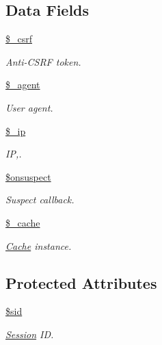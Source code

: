 \subsection*{Data Fields}
\begin{DoxyCompactItemize}
\item 
\hypertarget{class_session_a871411a78a77c508569c380dd06fdd51}{}\label{class_session_a871411a78a77c508569c380dd06fdd51} 
\hyperlink{class_session_a871411a78a77c508569c380dd06fdd51}{\$\+\_\+csrf}
\begin{DoxyCompactList}\small\item\em Anti-\/\+C\+S\+RF token. \end{DoxyCompactList}\item 
\hypertarget{class_session_a7e43e09863a494197e0cdbf3f98c2ff5}{}\label{class_session_a7e43e09863a494197e0cdbf3f98c2ff5} 
\hyperlink{class_session_a7e43e09863a494197e0cdbf3f98c2ff5}{\$\+\_\+agent}
\begin{DoxyCompactList}\small\item\em User agent. \end{DoxyCompactList}\item 
\hypertarget{class_session_ac275a475a83ee8de16cf9c9f928fbe77}{}\label{class_session_ac275a475a83ee8de16cf9c9f928fbe77} 
\hyperlink{class_session_ac275a475a83ee8de16cf9c9f928fbe77}{\$\+\_\+ip}
\begin{DoxyCompactList}\small\item\em IP,. \end{DoxyCompactList}\item 
\hypertarget{class_session_ad96efa4953d3355e4c1aabc5cebad482}{}\label{class_session_ad96efa4953d3355e4c1aabc5cebad482} 
\hyperlink{class_session_ad96efa4953d3355e4c1aabc5cebad482}{\$onsuspect}
\begin{DoxyCompactList}\small\item\em Suspect callback. \end{DoxyCompactList}\item 
\hypertarget{class_session_af7d8375fb97cbf318fea2d67df85c2b3}{}\label{class_session_af7d8375fb97cbf318fea2d67df85c2b3} 
\hyperlink{class_session_af7d8375fb97cbf318fea2d67df85c2b3}{\$\+\_\+cache}
\begin{DoxyCompactList}\small\item\em \hyperlink{class_cache}{Cache} instance. \end{DoxyCompactList}\end{DoxyCompactItemize}
\subsection*{Protected Attributes}
\begin{DoxyCompactItemize}
\item 
\hypertarget{class_session_a3b4e4b29ac1d6699dd65f8f0d6fa4133}{}\label{class_session_a3b4e4b29ac1d6699dd65f8f0d6fa4133} 
\hyperlink{class_session_a3b4e4b29ac1d6699dd65f8f0d6fa4133}{\$sid}
\begin{DoxyCompactList}\small\item\em \hyperlink{class_session}{Session} ID. \end{DoxyCompactList}\end{DoxyCompactItemize}



